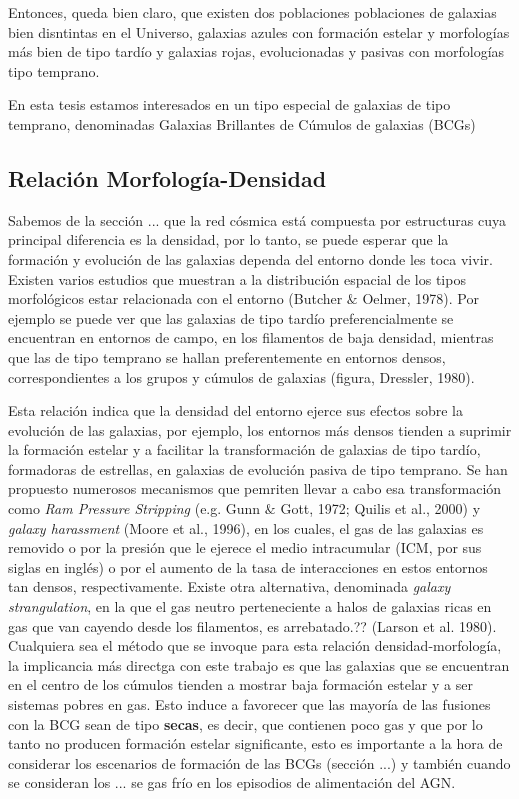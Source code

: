 Entonces, queda bien claro, que existen dos poblaciones poblaciones de galaxias bien disntintas
en el Universo, galaxias azules con formaci\'on estelar y morfolog\'ias m\'as bien de tipo
tard\'io y galaxias rojas, evolucionadas y pasivas con morfolog\'ias tipo temprano.

En esta tesis estamos interesados en un tipo especial de galaxias de tipo temprano, denominadas
Galaxias Brillantes de C\'umulos de galaxias (BCGs)


\subsection{Relaci\'on Morfolog\'ia-Densidad}
Sabemos de la secci\'on ... que la red c\'osmica est\'a compuesta por estructuras 
cuya principal diferencia es la densidad, por lo tanto, se puede esperar
que la formaci\'on y evoluci\'on de las galaxias dependa del entorno
donde les toca vivir. Existen varios estudios que muestran a la
distribuci\'on espacial de los tipos morfol\'ogicos
estar relacionada con el entorno (Butcher $\&$ Oelmer, 1978). Por ejemplo se puede
ver que las galaxias de tipo tard\'io preferencialmente se encuentran en entornos de campo,
en los filamentos de baja
densidad, mientras que las de tipo temprano se hallan preferentemente en entornos
densos, correspondientes a los grupos y c\'umulos de galaxias (figura, Dressler, 1980).

Esta relaci\'on indica que la densidad
del entorno ejerce sus efectos sobre la evoluci\'on de las galaxias, por ejemplo, 
los entornos m\'as densos tienden a suprimir la formaci\'on estelar y a facilitar
la transformaci\'on de galaxias de tipo tard\'io, formadoras de estrellas,
en galaxias de evoluci\'on pasiva de tipo
temprano. Se han propuesto numerosos mecanismos que pemriten llevar a cabo esa transformaci\'on
como {\it Ram Pressure Stripping} (e.g. Gunn $\&$ Gott, 1972; Quilis et al.,
2000) y {\it galaxy harassment} (Moore et al., 1996), en los cuales, el gas de las galaxias
es removido o por la presi\'on que le ejerece el medio intracumular (ICM, por sus siglas en ingl\'es)
o por el aumento de la tasa de interacciones en estos entornos tan densos, respectivamente.
Existe otra alternativa, denominada {\it galaxy strangulation}, en la que el gas neutro
perteneciente a halos de galaxias ricas en gas que van cayendo desde los filamentos, es arrebatado.??
(Larson et al. 1980). 
Cualquiera sea el m\'etodo que se invoque para esta relaci\'on densidad-morfolog\'ia,
la implicancia m\'as directga con este trabajo es que las galaxias que se encuentran
en el centro de los c\'umulos tienden a mostrar baja formaci\'on estelar y a ser sistemas pobres
en gas. Esto induce a favorecer que las mayor\'ia de las fusiones con la BCG sean de tipo {\bf secas},
es decir, que contienen poco gas y que por lo tanto no producen formaci\'on estelar significante,
esto es importante a la hora de considerar los escenarios de formaci\'on de las BCGs (secci\'on ...)
y tambi\'en cuando se consideran los ... se gas fr\'io en los episodios de alimentaci\'on del AGN.




